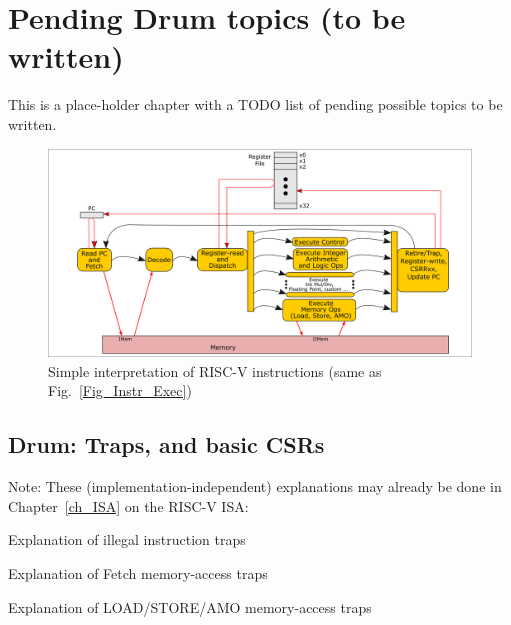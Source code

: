 

\chapter{Pending Drum topics (to be written)}


\setcounter{page}{1}
\renewcommand{\thepage}{\arabic{chapter}-\arabic{page}}

\label{ch_Drum_Pending}


This is a place-holder chapter with a TODO list of pending possible
topics to be written.

\begin{figure}[htbp]
  \centerline{\includegraphics[width=6in,angle=0]{ch030_RISCV_Design_Space/Figures/Fig_Instr_Exec}}
  \caption{\label{Fig_Pending_Simple_Instr_Exec}Simple interpretation of RISC-V instructions (same as Fig.~\ref{Fig_Instr_Exec})}
\end{figure}

\hdivider


\section{Drum: Traps, and basic CSRs}

Note: These (implementation-independent) explanations may already be
done in Chapter~\ref{ch_ISA} on the RISC-V ISA:

\begin{tightlist}
  \item Explanation of illegal instruction traps
  \item Explanation of Fetch memory-access traps
  \item Explanation of LOAD/STORE/AMO memory-access traps
\end{tightlist}

